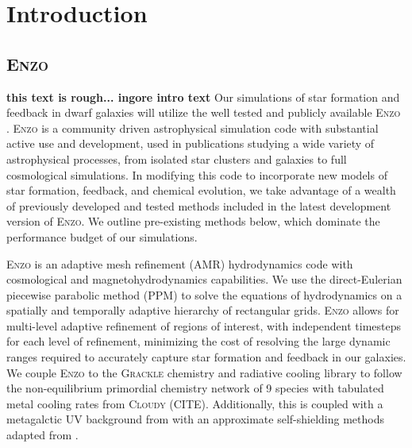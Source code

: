 \documentclass[11pt]{article}
\begin{document}
\maketitle

\section{Introduction}



\subsection{\textsc{Enzo}}

{\bf this text is rough... ingore intro text }
Our simulations of star formation and feedback in dwarf galaxies will utilize the well tested and publicly available \textsc{Enzo} \citep{Enzo-method}. \textsc{Enzo} is a community driven astrophysical simulation code with substantial active use and development, used in publications studying a wide variety of astrophysical processes, from isolated star clusters and galaxies to full cosmological simulations. In modifying this code to incorporate new models of star formation, feedback, and chemical evolution, we take advantage of a wealth of previously developed and tested methods included in the latest development version of \textsc{Enzo}. We outline pre-existing methods below, which dominate the performance budget of our simulations. 

\textsc{Enzo} is an adaptive mesh refinement (AMR) hydrodynamics code with cosmological and magnetohydrodynamics capabilities. We use the direct-Eulerian piecewise parabolic method (PPM) \citep{ColellaWoodward1984, Bryan1995} to solve the equations of hydrodynamics on a spatially and temporally adaptive hierarchy of rectangular grids. \textsc{Enzo} allows for multi-level adaptive refinement of regions of interest, with independent timesteps for each level of refinement, minimizing the cost of resolving the large dynamic ranges required to accurately capture star formation and feedback in our galaxies. We couple \textsc{Enzo} to the \textsc{Grackle} chemistry and radiative cooling library to follow the non-equilibrium primordial chemistry network of 9 species with tabulated metal cooling rates from \textsc{Cloudy} (CITE). Additionally, this is coupled with a metagalctic UV background from \cite{HM2012} with an approximate self-shielding methods adapted from \cite{XX}.  
\end{document}
